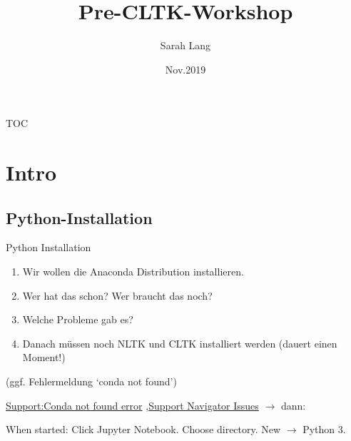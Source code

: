 \documentclass[10pt]{beamer}
\title{Pre-CLTK-Workshop}
\author{Sarah Lang}
\date{Nov.2019}
\begin{document}
\maketitle

\begin{frame}{TOC}
\tableofcontents
\end{frame}

\section{Intro}
\subsection{Python-Installation}

\begin{frame}{Python Installation}
\begin{enumerate}
    \item Wir wollen die Anaconda Distribution installieren.
    \item Wer hat das schon? Wer braucht das noch?
    \item Welche Probleme gab es?
    \item Danach müssen noch NLTK und CLTK installiert werden (dauert einen Moment!)
\end{enumerate}

\framebreak
{} (ggf. Fehlermeldung `conda not found')

\href{https://support.anaconda.com/hc/en-us/articles/360023863234-Conda-command-not-found-error}{Support:Conda not found error} \sep \href{https://support.anaconda.com/hc/en-us/articles/360024042553-Anaconda-Navigator-Issues-Launching-or-Initializing}{Support Navigator Issues}
$\to$ dann:


When started: Click Jupyter Notebook. Choose directory. New $\to$ Python 3.
    
\end{frame}
\end{document}
